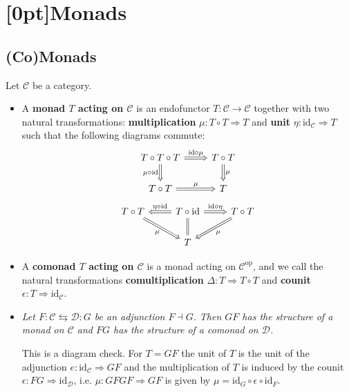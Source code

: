 \documentclass[10pt]{article}
\newcommand{\id}{\mathrm{id}}
\newcommand{\ccat}{\mathcal{C}}
\newcommand{\dcat}{\mathcal{D}}
\newcommand{\nt}{\Rightarrow}
\newcommand{\op}[1]{{#1}^\text{op}}
\newcommand{\CT}{\textcolor{orange}{CT}}
\begin{document}
    \section{\protect\marginnote{\CT}[0pt]Monads}

        \subsection{(Co)Monads}

            Let $\ccat$ be a category.

            \begin{itemize}
                \item A \textbf{monad $T$ acting on $\ccat$} is an endofunctor $T\colon\ccat\to\ccat$ together with two natural transformations: \textbf{multiplication} $\mu\colon T\circ T\nt T$ and \textbf{unit} $\eta\colon\id_\ccat\nt T$ such that the following diagrams commute:
                    \begin{equation*}
                        \begin{tikzcd}
                            T\circ T\circ T \ar[Rightarrow]{r}{\id\circ\mu} \ar[Rightarrow]{d}[swap]{\mu\circ\id}
                            & T\circ T \ar[Rightarrow]{d}{\mu}\\
                            T\circ T \ar[Rightarrow]{r}{\mu}
                            & T
                        \end{tikzcd}
                    \end{equation*}
                    \begin{equation*}
                        \begin{tikzcd}
                            T\circ T \ar[Rightarrow]{dr}[swap]{\mu}
                            & T\circ\id \ar[Rightarrow]{r}{\id\circ\eta} \ar[equal]{d} \ar[Rightarrow]{l}[swap]{\eta\circ\id}
                            & T\circ T \ar[Rightarrow]{dl}{\mu}\\
                            & T &
                        \end{tikzcd}
                    \end{equation*}
                    \item A \textbf{comonad $T$ acting on $\ccat$} is a monad acting on $\op{\ccat}$, and we call the natural transformations \textbf{comultiplication} $\Delta\colon T\nt T\circ T$ and \textbf{counit} $\epsilon\colon T\nt\id_\ccat$.
                    \item \emph{Let $F\colon\ccat\leftrightarrows\dcat\colon G$ be an adjunction $F\dashv G$.}
                        \emph{Then $GF$ has the structure of a monad on $\ccat$ and $FG$ has the structure of a comonad on $\dcat$.}

                        This is a diagram check. 
                        For $T=GF$ the unit of $T$ is the unit of the adjunction $e\colon\id_\ccat\nt GF$ and the multiplication of $T$ is induced by the counit $\epsilon\colon FG\nt\id_\dcat$, i.e. $\mu\colon GFGF\nt GF$ is given by $\mu=\id_G\circ\epsilon\circ\id_F$.
            \end{itemize}
\end{document}
